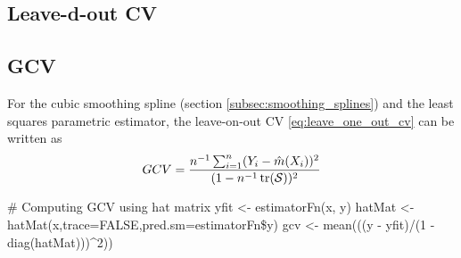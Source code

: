 \subsection{Leave-d-out CV}

\subsection{GCV}
\begin{theory}
 For the cubic smoothing spline (section \ref{subsec:smoothing_splines}) and the least squares parametric estimator,
 the leave-on-out CV \eqref{eq:leave_one_out_cv} can be written as
\begin{equation*}
 GCV = \frac{n^{-1}\sum_{i=1}^n(Y_i - \hat{m}(X_i))^2}{(1-n^{-1} \operatorname{tr}(\mathcal{S}))^2}
\end{equation*}
\end{theory}

\begin{code}
 # Computing GCV using hat matrix
 yfit <- estimatorFn(x, y)
 hatMat <- hatMat(x,trace=FALSE,pred.sm=estimatorFn\$y) %
 gcv <- mean(((y - yfit)/(1 - diag(hatMat)))^2))
\end{code}
